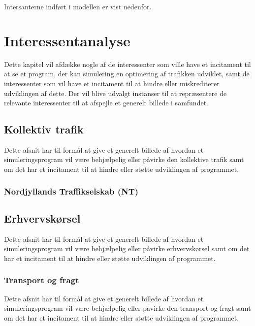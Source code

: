 Intersanterne indført i modellen er vist nedenfor.


\iffalse \chapter{Interessentanalyse}\label{Interessentanalyse} %

Dette kapitel vil afdække nogle af de interessenter som ville have et incitament til at se et program, der kan simulering en optimering af trafikken udviklet, samt de interessenter som vil have et incitament til at hindre eller miskrediterer udviklingen af dette. Der vil blive udvalgt instanser til at repræsentere de relevante interessenter til at afspejle et generelt billede i samfundet.

\section{Kollektiv trafik}\label{Kollektiv-trafik}

Dette afsnit har til formål at give et generelt billede af hvordan et simuleringsprogram vil være behjælpelig eller påvirke den kollektive trafik samt om det har et incitament til at hindre eller støtte udviklingen af programmet.

\subsection{Nordjyllands Traffikselskab (NT)}\label{Nordjyllands-Traffikselskab}



\section{Erhvervskørsel}\label{Erhvervskoersel}

Dette afsnit har til formål at give et generelt billede af hvordan et simuleringsprogram vil være behjælpelig eller påvirke erhvervskørsel samt om det har et incitament til at hindre eller støtte udviklingen af programmet.

\subsection{Transport og fragt}\label{Transport-og-fragt}

Dette afsnit har til formål at give et generelt billede af hvordan et simuleringsprogram vil være behjælpelig eller påvirke den transport og fragt samt om det har et incitament til at hindre eller støtte udviklingen af programmet.

